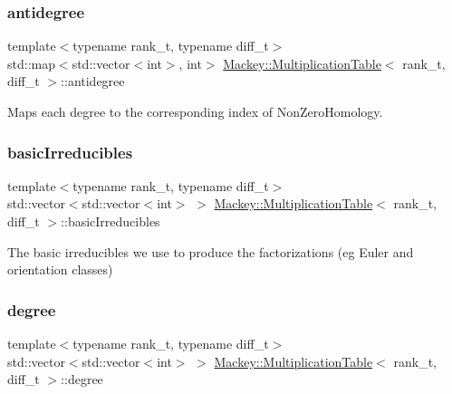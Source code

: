 \subsubsection{\texorpdfstring{antidegree}{antidegree}}
{\footnotesize\ttfamily template$<$typename rank\+\_\+t, typename diff\+\_\+t$>$ \\
std\+::map$<$std\+::vector$<$int$>$, int$>$ \hyperlink{classMackey_1_1MultiplicationTable}{Mackey\+::\+Multiplication\+Table}$<$ rank\+\_\+t, diff\+\_\+t $>$\+::antidegree\hspace{0.3cm}{\ttfamily [protected]}}



Maps each degree to the corresponding index of Non\+Zero\+Homology. 

\mbox{\label{classMackey_1_1MultiplicationTable_af6896ea01c087e71533de423d7cf65ac}} 
\subsubsection{\texorpdfstring{basic\+Irreducibles}{basicIrreducibles}}
{\footnotesize\ttfamily template$<$typename rank\+\_\+t, typename diff\+\_\+t$>$ \\
std\+::vector$<$std\+::vector$<$int$>$ $>$ \hyperlink{classMackey_1_1MultiplicationTable}{Mackey\+::\+Multiplication\+Table}$<$ rank\+\_\+t, diff\+\_\+t $>$\+::basic\+Irreducibles\hspace{0.3cm}{\ttfamily [protected]}}



The basic irreducibles we use to produce the factorizations (eg Euler and orientation classes) 

\mbox{\label{classMackey_1_1MultiplicationTable_a9a0d2a2d8561e378e08fcf4929df2cf6}} 
\subsubsection{\texorpdfstring{degree}{degree}}
{\footnotesize\ttfamily template$<$typename rank\+\_\+t, typename diff\+\_\+t$>$ \\
std\+::vector$<$std\+::vector$<$int$>$ $>$ \hyperlink{classMackey_1_1MultiplicationTable}{Mackey\+::\+Multiplication\+Table}$<$ rank\+\_\+t, diff\+\_\+t $>$\+::degree\hspace{0.3cm}{\ttfamily [protected]}}



